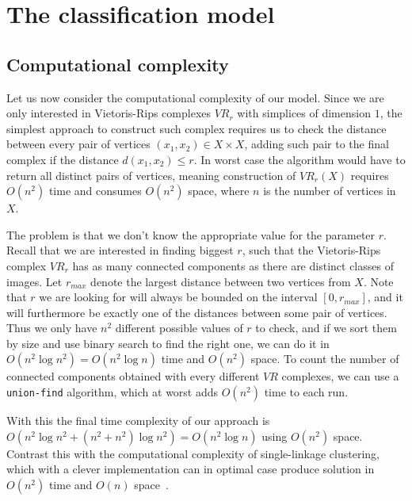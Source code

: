 \documentclass{article}
\newcommand{\enterProblemHeader}[1]{
}
\newcommand{\exitProblemHeader}[1]{
}
\newcounter{homeworkProblemCounter} %
\newcommand{\homeworkProblemName}{}
\newenvironment{homeworkProblem}[1][Problem \arabic{homeworkProblemCounter}]{ %
\stepcounter{homeworkProblemCounter} %
\renewcommand{\homeworkProblemName}{#1} %
\section{\homeworkProblemName} %
\enterProblemHeader{\homeworkProblemName} %
}{
\exitProblemHeader{\homeworkProblemName} %
}
\newcommand{\homeworkSectionName}{}
\newenvironment{homeworkSection}[1]{ %
\renewcommand{\homeworkSectionName}{#1} %
\subsection{\homeworkSectionName} %
\enterProblemHeader{\homeworkProblemName\ [\homeworkSectionName]} %
}{
\enterProblemHeader{\homeworkProblemName} %
}
\begin{document}
\begin{homeworkProblem}[The classification model]
\begin{homeworkSection}{Computational complexity}
  Let us now consider the computational complexity of our model. Since we are only interested in Vietoris-Rips complexes $VR_r$ with simplices of dimension $1$, the simplest approach to construct such complex requires us to check the distance between every pair of vertices $(x_1, x_2) \in X \times X$, adding such pair to the final complex if the distance $d(x_1, x_2) \le r$. In worst case the algorithm would have to return all distinct pairs of vertices, meaning construction of $VR_r(X)$ requires $O(n^2)$ time and consumes $O(n^2)$ space, where $n$ is the number of vertices in $X$.

  The problem is that we don't know the appropriate value for the parameter $r$. Recall that we are interested in finding biggest $r$, such that the Vietoris-Rips complex $VR_{r}$ has as many connected components as there are distinct classes of images. Let $r_{max}$ denote the largest distance between two vertices from $X$. Note that $r$ we are looking for will always be bounded on the interval $[0, r_{max}]$, and it will furthermore be exactly one of the distances between some pair of vertices. Thus we only have $n^2$ different possible values of $r$ to check, and if we sort them by size and use binary search to find the right one, we can do it in $O(n^2 \log n^2) = O(n^2 \log n)$ time and $O(n^2)$ space. To count the number of connected components obtained with every different $VR$ complexes, we can use a \texttt{union-find} algorithm, which at worst adds $O(n^2)$ time to each run.

  With this the final time complexity of our approach is $O(n^2 \log n^2 + (n^2 + n^2)\log n^2) = O(n^2 \log n)$ using $O(n^2)$ space. Contrast this with the computational complexity of single-linkage clustering, which with a clever implementation can in optimal case produce solution in $O(n^2)$ time and $O(n)$ space~\cite{gower1969minimum}.

\end{homeworkSection}




\end{homeworkProblem}
\end{document}
